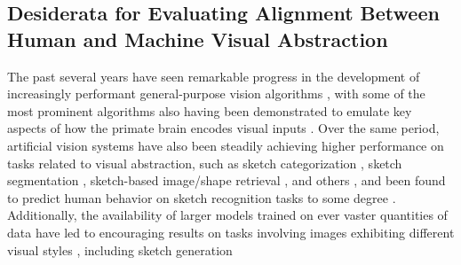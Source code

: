 \documentclass{article}
\begin{document}
\subsection{Desiderata for Evaluating Alignment Between Human and Machine Visual Abstraction}


The past several years have seen remarkable progress in the development of increasingly performant general-purpose vision algorithms \cite{simonyan2014very, he2016deep, dosovitskiy2020image, radford2021learning}, with some of the most prominent algorithms also having been demonstrated to emulate key aspects of how the primate brain encodes visual inputs \cite{yamins2014performance, kriegeskorte2015deep, zhuang2021unsupervised, konkle2022self}. 
Over the same period, artificial vision systems have also been steadily achieving higher performance on tasks related to visual abstraction, such as sketch categorization \cite{eitz2012humans, zhang2016sketchnet, ballester2016performance, yu2017sketch}, sketch segmentation \cite{li2018universal, yang2021sketchgnn}, sketch-based image/shape retrieval \cite{eitz2012sketch, sangkloy2016sketchy, yu2016sketch, song2017deep, bhunia2020sketch}, and others \cite{tripathi2020sketch, xu2022deep, lu2023learning, chowdhury2023can}, and been found to predict human behavior on sketch recognition tasks to some degree \cite{fan2018common}. 
Additionally, the availability of larger models trained on ever vaster quantities of data have led to encouraging results on tasks involving images exhibiting different visual styles \cite{radford2021learning}, including sketch generation
\end{document}
